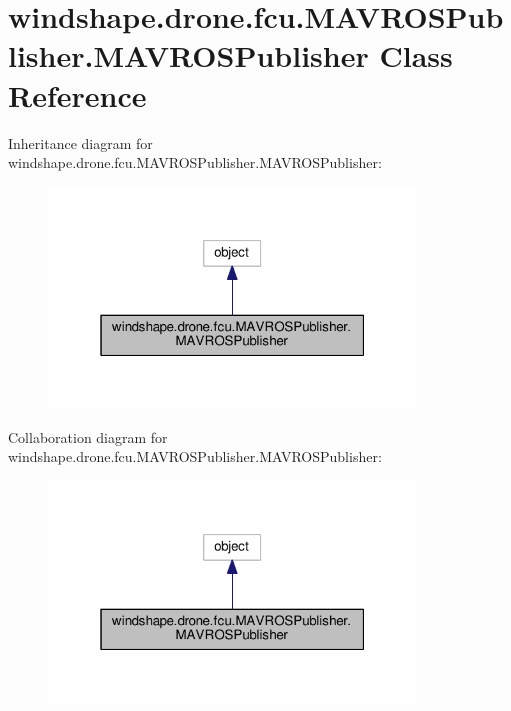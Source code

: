 \hypertarget{classwindshape_1_1drone_1_1fcu_1_1_m_a_v_r_o_s_publisher_1_1_m_a_v_r_o_s_publisher}{}\section{windshape.\+drone.\+fcu.\+M\+A\+V\+R\+O\+S\+Publisher.\+M\+A\+V\+R\+O\+S\+Publisher Class Reference}
\label{classwindshape_1_1drone_1_1fcu_1_1_m_a_v_r_o_s_publisher_1_1_m_a_v_r_o_s_publisher}


Inheritance diagram for windshape.\+drone.\+fcu.\+M\+A\+V\+R\+O\+S\+Publisher.\+M\+A\+V\+R\+O\+S\+Publisher\+:\nopagebreak
\begin{figure}[H]
\begin{center}
\leavevmode
\includegraphics[width=277pt]{classwindshape_1_1drone_1_1fcu_1_1_m_a_v_r_o_s_publisher_1_1_m_a_v_r_o_s_publisher__inherit__graph}
\end{center}
\end{figure}


Collaboration diagram for windshape.\+drone.\+fcu.\+M\+A\+V\+R\+O\+S\+Publisher.\+M\+A\+V\+R\+O\+S\+Publisher\+:\nopagebreak
\begin{figure}[H]
\begin{center}
\leavevmode
\includegraphics[width=277pt]{classwindshape_1_1drone_1_1fcu_1_1_m_a_v_r_o_s_publisher_1_1_m_a_v_r_o_s_publisher__coll__graph}
\end{center}
\end{figure}

